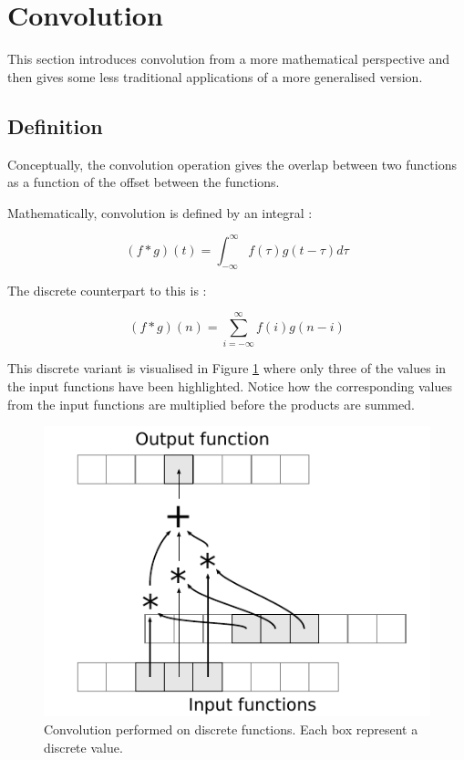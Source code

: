 \section{Convolution}
This section introduces convolution from a more mathematical perspective and then gives some less traditional applications of a more generalised version.

\subsection{Definition}
Conceptually, the convolution operation gives the overlap between two functions as a function of the offset between the functions.

Mathematically, convolution is defined by an integral \cite{convolution1}:

\[
    (f * g)(t) = \int^{\infty}_{-\infty}{f(\tau)g(t-\tau) d\tau}
\]

The discrete counterpart to this is \cite{convolution2}:

\[
    (f * g)(n) = \sum^{\infty}_{i=-\infty}{f(i)g(n-i)}
\]

This discrete variant is visualised in Figure \ref{fig:VisualConvolution} where only three of the values in the input functions have been highlighted.
Notice how the corresponding values from the input functions are multiplied before the products are summed.

\begin{figure}
    \centering
    \includegraphics{img/VisualConvolution}
    \caption[Convolution performed on discrete functions]{
        Convolution performed on discrete functions.
        Each box represent a discrete value.
    }
    \label{fig:VisualConvolution}
\end{figure}

